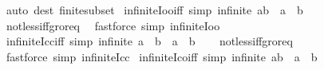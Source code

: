 \begin{isabellebody}
\ {\isacharparenleft}{\kern0pt}auto\ dest{\isacharcolon}{\kern0pt}\ finite{\isacharunderscore}{\kern0pt}subset{\isacharparenright}{\kern0pt}%
\endisatagproof
{\isafoldproof}%
%
\isadelimproof
\isanewline
%
\endisadelimproof
\isanewline
{}\isamarkupfalse%
\ infinite{\isacharunderscore}{\kern0pt}Ioo{\isacharunderscore}{\kern0pt}iff\ {\isacharbrackleft}{\kern0pt}simp{\isacharbrackright}{\kern0pt}{\isacharcolon}{\kern0pt}\ {\isachardoublequoteopen}infinite\ {\isacharbraceleft}{\kern0pt}a{\isacharless}{\kern0pt}{\isachardot}{\kern0pt}{\isachardot}{\kern0pt}{\isacharless}{\kern0pt}b{\isacharbraceright}{\kern0pt}\ {\isasymlongleftrightarrow}\ a\ {\isacharless}{\kern0pt}\ b{\isachardoublequoteclose}\isanewline
%
\isadelimproof
\ \ %
\endisadelimproof
%
\isatagproof
{}\isamarkupfalse%
\ not{\isacharunderscore}{\kern0pt}less{\isacharunderscore}{\kern0pt}iff{\isacharunderscore}{\kern0pt}gr{\isacharunderscore}{\kern0pt}or{\isacharunderscore}{\kern0pt}eq\ \isamarkupfalse%
\ {\isacharparenleft}{\kern0pt}fastforce\ simp{\isacharcolon}{\kern0pt}\ infinite{\isacharunderscore}{\kern0pt}Ioo{\isacharparenright}{\kern0pt}%
\endisatagproof
{\isafoldproof}%
%
\isadelimproof
\isanewline
%
\endisadelimproof
\isanewline
{}\isamarkupfalse%
\ infinite{\isacharunderscore}{\kern0pt}Icc{\isacharunderscore}{\kern0pt}iff\ {\isacharbrackleft}{\kern0pt}simp{\isacharbrackright}{\kern0pt}{\isacharcolon}{\kern0pt}\ {\isachardoublequoteopen}infinite\ {\isacharbraceleft}{\kern0pt}a\ {\isachardot}{\kern0pt}{\isachardot}{\kern0pt}\ b{\isacharbraceright}{\kern0pt}\ {\isasymlongleftrightarrow}\ a\ {\isacharless}{\kern0pt}\ b{\isachardoublequoteclose}\isanewline
%
\isadelimproof
\ \ %
\endisadelimproof
%
\isatagproof
{}\isamarkupfalse%
\ not{\isacharunderscore}{\kern0pt}less{\isacharunderscore}{\kern0pt}iff{\isacharunderscore}{\kern0pt}gr{\isacharunderscore}{\kern0pt}or{\isacharunderscore}{\kern0pt}eq\ \isamarkupfalse%
\ {\isacharparenleft}{\kern0pt}fastforce\ simp{\isacharcolon}{\kern0pt}\ infinite{\isacharunderscore}{\kern0pt}Icc{\isacharparenright}{\kern0pt}%
\endisatagproof
{\isafoldproof}%
%
\isadelimproof
\isanewline
%
\endisadelimproof
\isanewline
{}\isamarkupfalse%
\ infinite{\isacharunderscore}{\kern0pt}Ico{\isacharunderscore}{\kern0pt}iff\ {\isacharbrackleft}{\kern0pt}simp{\isacharbrackright}{\kern0pt}{\isacharcolon}{\kern0pt}\ {\isachardoublequoteopen}infinite\ {\isacharbraceleft}{\kern0pt}a{\isachardot}{\kern0pt}{\isachardot}{\kern0pt}{\isacharless}{\kern0pt}b{\isacharbraceright}{\kern0pt}\ {\isasymlongleftrightarrow}\ a\ {\isacharless}{\kern0pt}\ b{\isachardoublequoteclose}\isanewline

\end{isabellebody}
